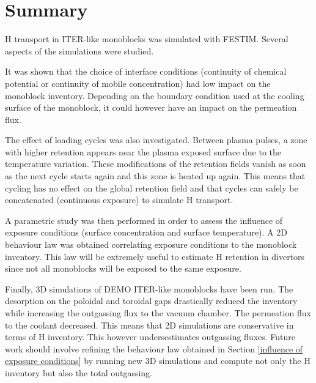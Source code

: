 \section{Summary}
H transport in ITER-like monoblocks was simulated with FESTIM.
Several aspects of the simulations were studied.

It was shown that the choice of interface conditions (continuity of chemical potential or continuity of mobile concentration) had low impact on the monoblock inventory.
Depending on the boundary condition used at the cooling surface of the monoblock, it could however have an impact on the permeation flux.

The effect of loading cycles was also investigated.
Between plasma pulses, a zone with higher retention appears near the plasma exposed surface due to the temperature variation.
These modifications of the retention fields vanish as soon as the next cycle starts again and this zone is heated up again.
This means that cycling has no effect on the global retention field and that cycles can safely be concatenated (continuous exposure) to simulate H transport.

A parametric study was then performed in order to assess the influence of exposure conditions (surface concentration and surface temperature).
A 2D behaviour law was obtained correlating exposure conditions to the monoblock inventory.
This law will be extremely useful to estimate H retention in divertors since not all monoblocks will be exposed to the same exposure.

Finally, 3D simulations of DEMO ITER-like monoblocks have been run.
The desorption on the poloidal and toroidal gaps drastically reduced the inventory while increasing the outgassing flux to the vacuum chamber.
The permeation flux to the coolant decreased.
This means that 2D simulations are conservative in terms of H inventory.
This however undersestimates outgassing fluxes.
Future work should involve refining the behaviour law obtained in Section \ref{influence of exposure conditions} by running new 3D simulations and compute not only the H inventory but also the total outgassing.
